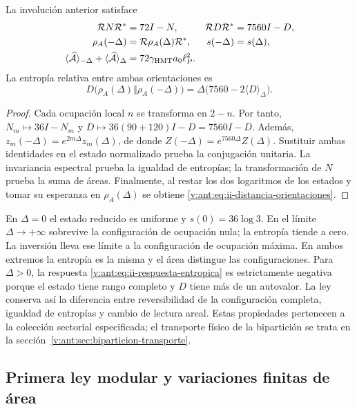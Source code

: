 \begin{theorem}
La involución anterior satisface
\begin{align}
 \mathcal R N\mathcal R^*&=72I-N,&
 \mathcal R D\mathcal R^*&=7560I-D,\\
 \rho_A(-\Delta)&=\mathcal R\rho_A(\Delta)\mathcal R^*,&
 s(-\Delta)&=s(\Delta),
 \label{v:ant:eq:ii-inversion-entropia}\\
 \langle\widehat{\mathcal A}\rangle_{-\Delta}
 +\langle\widehat{\mathcal A}\rangle_\Delta
 &=72\gamma_{\mathrm{HMT}}a_0\ell_P^2.&&
 \label{v:ant:eq:ii-area-complementaria}
\end{align}
La entropía relativa entre ambas orientaciones es
\begin{equation}
 D\bigl(\rho_A(\Delta)\Vert\rho_A(-\Delta)\bigr)
 =\Delta\bigl(7560-2\langle D\rangle_\Delta\bigr).
 \label{v:ant:eq:ii-distancia-orientaciones}
\end{equation}
\end{theorem}
\begin{proof}
Cada ocupación local $n$ se transforma en $2-n$. Por tanto,
$N_m\mapsto36I-N_m$ y
$D\mapsto36(90+120)I-D=7560I-D$.
Además, $z_m(-\Delta)=e^{2m\Delta}z_m(\Delta)$,
de donde $Z(-\Delta)=e^{7560\Delta}Z(\Delta)$.
Sustituir ambas identidades en el estado normalizado prueba la
conjugación unitaria. La invariancia espectral prueba la igualdad
de entropías; la transformación de $N$ prueba la suma de áreas.
Finalmente, al restar los dos logaritmos de los estados y tomar
su esperanza en $\rho_A(\Delta)$ se obtiene
\eqref{v:ant:eq:ii-distancia-orientaciones}.
\end{proof}

En $\Delta=0$ el estado reducido es uniforme y
$s(0)=36\log3$. En el límite $\Delta\to+\infty$ sobrevive
la configuración de ocupación nula; la entropía tiende a cero.
La inversión lleva ese límite a la configuración de ocupación máxima.
En ambos extremos la entropía es la misma y el área distingue las
configuraciones. Para $\Delta>0$, la respuesta
\eqref{v:ant:eq:ii-respuesta-entropica} es estrictamente negativa porque
el estado tiene rango completo y $D$ tiene más de un autovalor.
La ley conserva así la diferencia entre reversibilidad de la
configuración completa, igualdad de entropías y cambio de lectura areal.
Estas propiedades pertenecen a la colección sectorial especificada;
el transporte físico de la bipartición se trata en
la sección~\ref{v:ant:sec:biparticion-transporte}.

\subsection{Primera ley modular y variaciones finitas de área}
\label{v:ant:sec:ii-area-ley-modular}

